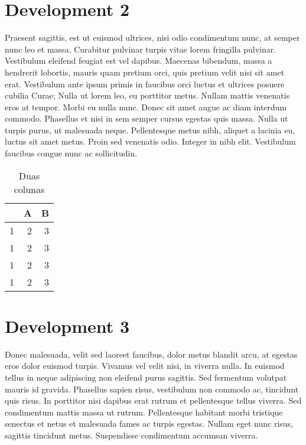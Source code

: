 \documentclass{genos-technical-report}
\begin{document}
\section{Development 2}
\label{sec:development-2}


Praesent sagittis, est ut euismod ultrices, nisi odio condimentum
nunc, at semper nunc leo et massa. Curabitur pulvinar turpis vitae
lorem fringilla pulvinar. Vestibulum eleifend feugiat est vel
dapibus. Maecenas bibendum, massa a hendrerit lobortis, mauris quam
pretium orci, quis pretium velit nisi sit amet erat. Vestibulum ante
ipsum primis in faucibus orci luctus et ultrices posuere cubilia
Curae; Nulla ut lorem leo, eu porttitor metus. Nullam mattis venenatis
eros at tempor. Morbi eu nulla nunc. Donec sit amet augue ac diam
interdum commodo. Phasellus et nisi in sem semper cursus egestas quis
massa. Nulla ut turpis purus, ut malesuada neque. Pellentesque metus
nibh, aliquet a lacinia eu, luctus sit amet metus. Proin sed venenatis
odio. Integer in nibh elit. Vestibulum faucibus congue nunc ac
sollicitudin.

\begin{table}
  \centering
  \begin{tabular}{l|rr}
    & A & B \\
    \hline
    1 & 2 & 3 \\
    1 & 2 & 3 \\
    1 & 2 & 3 \\
    1 & 2 & 3
  \end{tabular}
  \caption{Duas colunas}
  \label{tab:duas}
\end{table}

\section{Development 3}
\label{sec:development-3}

Donec malesuada, velit sed laoreet faucibus, dolor metus blandit arcu,
at egestas eros dolor euismod turpis. Vivamus vel velit nisi, in
viverra nulla. In euismod tellus in neque adipiscing non eleifend
purus sagittis. Sed fermentum volutpat mauris id gravida. Phasellus
sapien risus, vestibulum non commodo ac, tincidunt quis risus. In
porttitor nisi dapibus erat rutrum et pellentesque tellus viverra. Sed
condimentum mattis massa ut rutrum. Pellentesque habitant morbi
tristique senectus et netus et malesuada fames ac turpis
egestas. Nullam eget nunc risus, sagittis tincidunt metus. Suspendisse
condimentum accumsan viverra.
\end{document}
